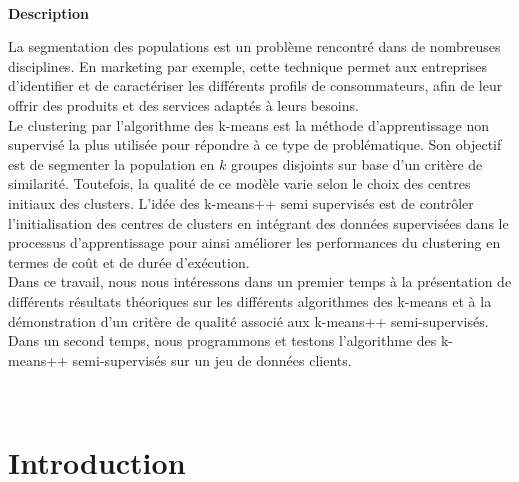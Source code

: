 \documentclass[12pt,a4paper]{book}
\newcommand{\1}{\mathds{1}}
\begin{document}
\thispagestyle{empty}
\newpage
~



\newpage
\setcounter{page}{1}

\noindent
{\LARGE \textbf{Description}}
\vspace{5 mm}

\noindent
La segmentation des populations est un problème rencontré dans de  nombreuses disciplines. En marketing par exemple, cette technique permet aux entreprises d'identifier et de caractériser les différents profils de consommateurs, afin de leur offrir des produits et des services adaptés à  leurs besoins.\\

\noindent
Le clustering par l'algorithme des k-means est la méthode d'apprentissage non supervisé la plus utilisée pour répondre à ce type de problématique. Son objectif est de segmenter la population en $k$ groupes disjoints sur base d'un critère de similarité. Toutefois, la qualité de ce modèle varie selon le choix des centres initiaux des clusters. L'idée des k-means++ semi supervisés est de contrôler l'initialisation des centres de clusters en intégrant des données supervisées dans le processus d'apprentissage pour ainsi améliorer les performances du clustering en termes de coût et de durée d'exécution.\\

\noindent
Dans ce travail, nous nous intéressons dans un premier temps à la présentation de différents résultats théoriques sur les différents algorithmes des k-means et à la démonstration d'un critère de qualité associé aux k-means++ semi-supervisés. Dans un second temps, nous programmons et testons l'algorithme des k-means++ semi-supervisés sur un jeu de données clients.


\tableofcontents
\newpage
~




\newpage


\section*{Introduction}
\end{document}
